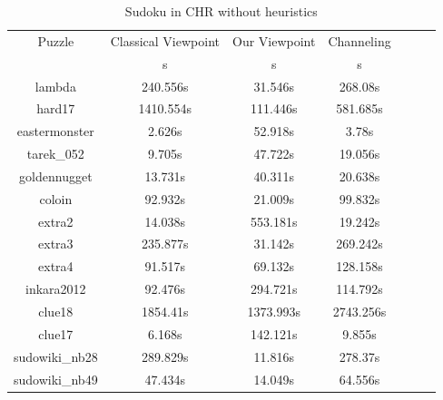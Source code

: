 \documentclass{report}
\begin{document}
\begin{table}[h!]
      \begin{tabular}{|c|c|c|c|c|c|c|}
        \hline
        \multirow{1}{*}{Puzzle} &
          \multicolumn{1}{L|}{Classical Viewpoint} &
          \multicolumn{1}{L|}{Our Viewpoint} &
          \multicolumn{1}{L|}{Channeling} \\
        & s & s & s \\
        \hline
lambda & 240.556s & 31.546s & 268.08s \\
hard17 & 1410.554s & 111.446s & 581.685s \\
eastermonster & 2.626s & 52.918s & 3.78s \\
tarek\_052 & 9.705s & 47.722s & 19.056s \\
goldennugget & 13.731s & 40.311s & 20.638s \\
coloin & 92.932s & 21.009s & 99.832s \\
extra2 & 14.038s & 553.181s & 19.242s \\
extra3 & 235.877s & 31.142s & 269.242s \\
extra4 & 91.517s & 69.132s & 128.158s \\
inkara2012 & 92.476s & 294.721s & 114.792s \\
clue18 & 1854.41s & 1373.993s & 2743.256s \\
clue17 & 6.168s & 142.121s & 9.855s \\
sudowiki\_nb28 & 289.829s & 11.816s & 278.37s \\
sudowiki\_nb49 & 47.434s & 14.049s & 64.556s \\
 \hline
      \end{tabular}
        \caption{Sudoku in CHR without heuristics}

    \end{table}
    
\end{document}
